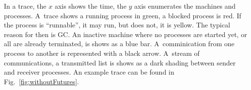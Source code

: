 In a trace, the $x$ axis shows the time, the $y$ axis enumerates the machines and processes. A~trace shows a running process in green, a blocked process is red. If the process is \enquote{runnable}, \ie it may run, but does not, it is yellow. The typical reason for then is GC. An inactive machine where no processes are started yet, or all are already terminated, is shows as a blue bar. A~comminication from one process to another is represented with a black arrow. A~stream of communications, \eg a transmitted list is shows as a dark shading between sender and receiver processes. An example trace can be found in Fig.~\ref{fig:withoutFutures}.


